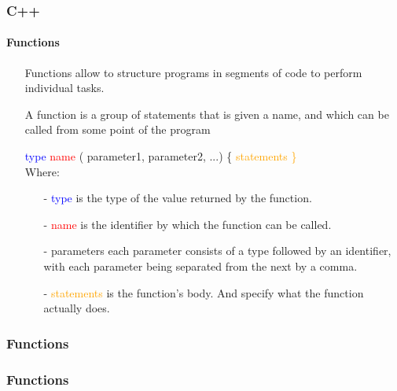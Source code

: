 \documentclass[hyperref={pdfpagelabels=true}]{beamer}
\begin{document}
\begin{frame}
\frametitle{C++}
\framesubtitle{Functions}
\begin{itemize}
\item[\ding{36}] Functions allow to structure programs in segments of code to perform individual tasks.
\item[\ding{36}] A function is a group of statements that is given a name, and which can be called from some point of the program
\item[\ding{36}] {\small \textcolor{blue}{type} \textcolor{red}{name} (\textcolor{mygreen}{ parameter1, parameter2, ...}) \{ \textcolor{orange}{statements \}}}
\\ \vfill Where: \\
\begin{itemize}
\item[-] \textcolor{blue}{type} is the type of the value returned by the function.
\item[-] \textcolor{red}{name} is the identifier by which the function can be called.
\item[-] \textcolor{mygreen}{ parameters} each parameter consists of a type followed by an identifier, with each parameter being separated from the next by a comma.
\item[-]  \textcolor{orange}{statements} is the function's body. And specify what the function actually does.
\end{itemize}
\end{itemize}
\end{frame}

\begin{frame}
\frametitle{Functions}
\begin{tcolorbox}[title= ,width=11.5 cm]

\end{tcolorbox}
\end{frame}


\begin{frame}
\frametitle{Functions}
\begin{tcolorbox}[title= ,width=9.85 cm]

\end{tcolorbox}
\end{frame}
\end{document}
